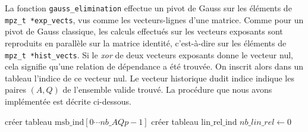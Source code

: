 La fonction \texttt{gauss\_elimination} effectue un pivot de Gauss sur les
éléments de \texttt{mpz\_t *exp\_vects}, vus comme les vecteurs-lignes d'une
matrice. Comme pour un pivot de Gauss classique, les calculs effectués sur les
vecteurs exposants sont reproduits en parallèle sur la matrice identité,
c'est-à-dire sur les éléments de \texttt{mpz\_t *hist\_vects}. Si le
\textit{xor} de deux vecteurs exposants donne le vecteur nul, cela signifie
qu'une relation de dépendance a été trouvée. On inscrit alors dans un tableau
l'indice de ce vecteur nul. Le vecteur historique dudit indice indique les
paires $(A,Q)$ de l'ensemble valide trouvé. La procédure que nous avons 
implémentée est décrite ci-dessous. 

\vspace{1em}
\begin{algorithm}[H]
\DontPrintSemicolon
\caption{}
\vspace{0.5em}
\vspace{0.5em}
créer tableau $\mathrm{msb\_ind}[0 \cdots nb\_AQp - 1]$\;  
créer tableau $\mathrm{lin\_rel\_ind}$\; 
$nb\_lin\_rel \gets 0$\; 
\vspace{0.5em}
\vspace{0.5em}
\vspace{0.5em}


\end{algorithm}
